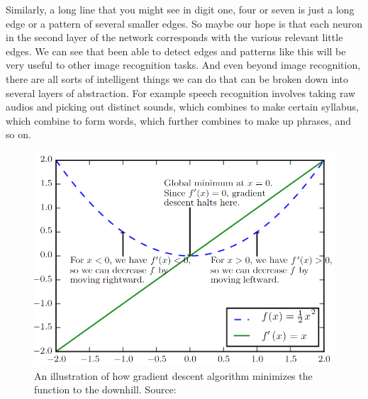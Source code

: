 \documentclass[master]{thesis-uestc}
\begin{document}
Similarly, a long line that you might see in digit one, four or seven is just a long edge or a pattern of several smaller edges. So maybe our hope is that each neuron in the second layer of the network corresponds with the various relevant little edges. We can see that been able to detect edges and patterns like this will be very useful to other image recognition tasks. And even beyond image recognition, there are all sorts of intelligent things we can do that can be broken down into several layers of abstraction. For example speech recognition involves taking raw audios and picking out distinct sounds, which combines to make certain syllabus, which combine to form words, which further combines to make up phrases, and so on.

\begin{figure}[ht]
\includegraphics[width=5in]{pic/gradient_descent.PNG}
\caption{An illustration of how gradient descent algorithm minimizes the function to the downhill. Source: }
\label{fig_gradient_descent}
\end{figure}
\end{document}
